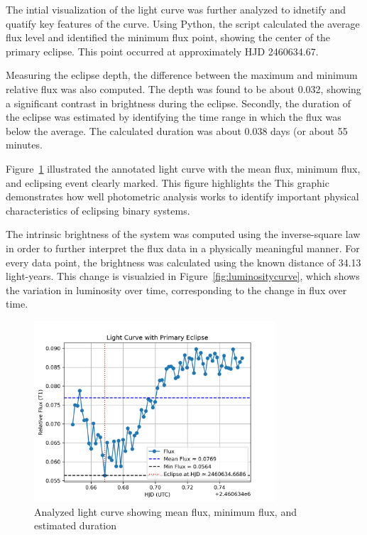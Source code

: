 The intial visualization of the light curve was further analyzed to idnetify and quatify key 
features of the curve. Using Python, the script calculated the average flux level and identified 
the minimum flux point, showing the center of the primary eclipse. This point occurred at 
approximately HJD 2460634.67.

Measuring the eclipse depth, the difference between the maximum and minimum relative flux was also
computed. The depth was found to be about 0.032, showing a significant contrast in brightness 
during the eclipse. Secondly, the duration of the eclipse was estimated by identifying the time
range in which the flux was below the average. The calculated duration was about 0.038 days (or about 55 minutes.

Figure~\ref{fig:analyzedcurve} illustrated the annotated light curve with the mean flux, 
minimum flux, and eclipsing event clearly marked. This figure highlights the This graphic 
demonstrates how well photometric analysis works to identify important physical characteristics of 
eclipsing binary systems.

The intrinsic brightness of the system was computed using the inverse-square law in order to further 
interpret the flux data in a physically meaningful manner. For every data point, the brightness was 
calculated using the known distance of 34.13 light-years. This change is visualzied in
Figure~\ref{fig:luminositycurve}, which shows the variation in luminosity over time, corresponding
to the change in flux over time.

\begin{figure}[h!]
	\centering
	\includegraphics[width=0.8\textwidth]{figs/analyzed_light_curve.png}
	\caption{Analyzed light curve showing mean flux, minimum flux, and estimated duration}
	\label{fig:analyzedcurve}
\end{figure}

